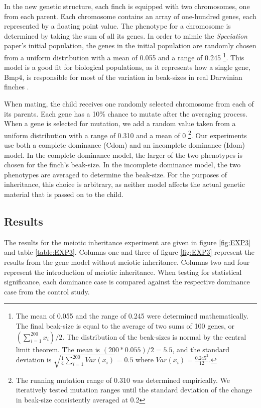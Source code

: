 \documentclass[conference]{IEEEtran}
\begin{document}
In the new genetic structure, each finch is equipped with two chromosomes, one from each parent. Each chromosome contains an array of one-hundred genes, each represented by a floating point value. The phenotype for a chromosome is determined by taking the sum of all its genes. In order to mimic the \textit{Speciation} paper’s initial population, the genes in the initial population are randomly chosen from a uniform distribution with a mean of 0.055 and a range of 0.245 \footnote{The mean of 0.055 and the range of 0.245 were determined mathematically. The final beak-size is equal to the average of two sums of 100 genes, or $(\sum_{i=1}^{200} x_{i})/2$. The distribution of the beak-sizes is normal by the central limit theorem. The mean is $(200 * 0.055)/2 = 5.5$, and the standard deviation is $\sqrt{\frac{1}{4}\sum_{i=1}^{200}Var(x_{i})} = 0.5$ where $Var(x_{i}) = \frac{0.245^2}{12}$.}. This model is a good fit for biological populations, as it represents how a single gene, Bmp4, is responsible for most of the variation in beak-sizes in real Darwinian finches \cite{BMP4}. 

When mating, the child receives one randomly selected chromosome from each of its parents. Each gene has a 10\% chance to mutate after the averaging process. When a gene is selected for mutation, we add a random value taken from a uniform distribution with a range of 0.310 and a mean of 0 \footnote{The running mutation range of 0.310 was determined empirically. We iteratively tested mutation ranges until the standard deviation of the change in beak-size consistently averaged at 0.2}. Our experiments use both a complete dominance (Cdom) and an incomplete dominance (Idom) model. In the complete dominance model, the larger of the two phenotypes is chosen for the finch's beak-size. In the incomplete dominance model, the two phenotypes are averaged to determine the beak-size. For the purposes of inheritance, this choice is arbitrary, as neither model affects the actual genetic material that is passed on to the child. 

\subsection{Results}

The results for the meiotic inheritance experiment are given in figure \ref{fig:EXP3} and table \ref{table:EXP3}. Columns one and three of figure \ref{fig:EXP3} represent the results from the gene model without meiotic inheritance. Columns two and four represent the introduction of meiotic inheritance. When testing for statistical significance, each dominance case is compared against the respective dominance case from the control study. 
\end{document}
